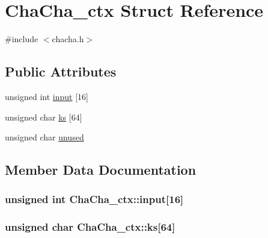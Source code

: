 \hypertarget{struct_cha_cha__ctx}{}\section{Cha\+Cha\+\_\+ctx Struct Reference}
\label{struct_cha_cha__ctx}


{\ttfamily \#include $<$chacha.\+h$>$}

\subsection*{Public Attributes}
\begin{DoxyCompactItemize}
\item 
unsigned int \hyperlink{struct_cha_cha__ctx_a23c8f14862a495694fd80d00b7fc4933}{input} \mbox{[}16\mbox{]}
\item 
unsigned char \hyperlink{struct_cha_cha__ctx_aba11226822410c64300df255a3e0c68a}{ks} \mbox{[}64\mbox{]}
\item 
unsigned char \hyperlink{struct_cha_cha__ctx_af90c0b840ad1c93389c9db31dd294b54}{unused}
\end{DoxyCompactItemize}


\subsection{Member Data Documentation}
\subsubsection[{\texorpdfstring{input}{input}}]{\setlength{\rightskip}{0pt plus 5cm}unsigned int Cha\+Cha\+\_\+ctx\+::input\mbox{[}16\mbox{]}}\hypertarget{struct_cha_cha__ctx_a23c8f14862a495694fd80d00b7fc4933}{}\label{struct_cha_cha__ctx_a23c8f14862a495694fd80d00b7fc4933}
\subsubsection[{\texorpdfstring{ks}{ks}}]{\setlength{\rightskip}{0pt plus 5cm}unsigned char Cha\+Cha\+\_\+ctx\+::ks\mbox{[}64\mbox{]}}\hypertarget{struct_cha_cha__ctx_aba11226822410c64300df255a3e0c68a}{}\label{struct_cha_cha__ctx_aba11226822410c64300df255a3e0c68a}
